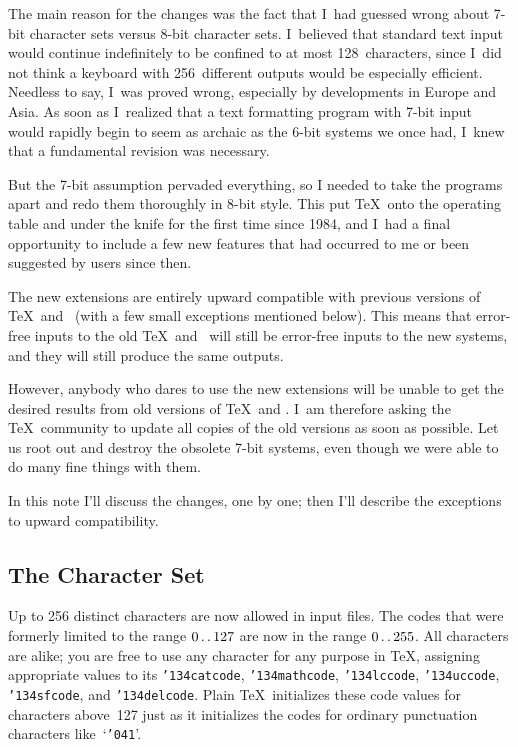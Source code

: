 The main reason for the changes was the fact that I~had guessed wrong about
7-bit character sets versus 8-bit character sets. I~believed that standard text
input would continue indefinitely to be confined to at most 128~characters,
since I~did not think a keyboard with 256~different outputs would be
especially efficient. Needless to say, I~was proved wrong, especially by
developments in Europe and Asia. As soon as I~realized that a text formatting
program with 7-bit input would rapidly begin to seem as archaic as the 6-bit
systems we once had, I~knew that a fundamental revision was necessary.

But the 7-bit assumption pervaded everything, so I needed to take the programs
apart and redo them thoroughly in 8-bit style. This put \TeX\
onto the operating table and under the knife
for the first time since 1984, and I~had a final
opportunity to include a few new features that had occurred to me or been
suggested by users since then.

The new extensions are entirely upward compatible with previous versions
of \TeX\ and \MF\ (with a few small exceptions mentioned below).
This means that error-free inputs to the old \TeX\ and \MF\ will still
be error-free inputs to the new systems, and they will still produce the
same outputs.

However, anybody who dares to use the new extensions will be unable to get
the desired results from old versions of \TeX\ and \MF\null. I~am therefore
asking the \TeX\ community to update all copies of the old versions
as soon as possible. Let us root out and destroy the obsolete 7-bit systems,
even though we were able to do many fine things with them.

In this note I'll discuss the changes, one by one; then I'll describe
the exceptions to upward compatibility.

\subsection{The Character Set}

Up to 256 distinct characters are now allowed in input files. The codes that
were formerly limited to the range $0\mathinner{\ldotp\ldotp} 127$ are now in the range
$0\mathinner{\ldotp\ldotp} 255$. All characters are alike; you are free to use any character
for any purpose in \TeX, assigning appropriate values to its
{\tt{\char'134}catcode},
{\tt{\char'134}mathcode},
{\tt{\char'134}lccode},
{\tt{\char'134}uccode},
{\tt{\char'134}sfcode},
and
{\tt{\char'134}delcode}.
Plain \TeX\ initializes these code values for characters above~127 just as
it initializes the codes for ordinary punctuation characters
like~`{\tt{\char'041}}'. 

